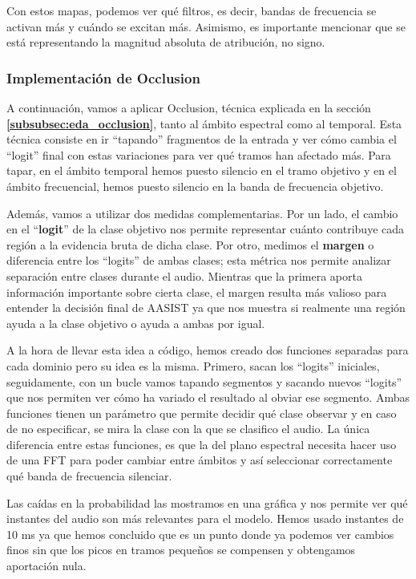 Con estos mapas, podemos ver qué filtros, es decir, bandas de frecuencia se activan más y cuándo se excitan más. Asimismo, es importante mencionar que se está representando la magnitud absoluta de atribución, no signo.

\subsubsection*{Implementación de Occlusion}
A continuación, vamos a aplicar Occlusion, técnica explicada en la sección \textbf{\ref{subsubsec:eda_occlusion}}, tanto al ámbito espectral como al temporal. Esta técnica consiste en ir ``tapando'' fragmentos de la entrada y ver cómo cambia el ``logit'' final con estas variaciones para ver qué tramos han afectado más. Para tapar, en el ámbito temporal hemos puesto silencio en el tramo objetivo y en el ámbito frecuencial, hemos puesto silencio en la banda de frecuencia objetivo.

Además, vamos a utilizar dos medidas complementarias. Por un lado, el cambio en el ``\textbf{logit}'' de la clase objetivo nos permite representar cuánto contribuye cada región a la evidencia bruta de dicha clase. Por otro, medimos el \textbf{margen} o diferencia entre los ``logits'' de ambas clases; esta métrica nos permite analizar separación entre clases durante el audio. Mientras que la primera aporta información importante sobre cierta clase, el margen resulta más valioso para entender la decisión final de AASIST ya que nos muestra si realmente una región ayuda a la clase objetivo o ayuda a ambas por igual. 

A la hora de llevar esta idea a código, hemos creado dos funciones separadas para cada dominio pero su idea es la misma. Primero, sacan los ``logits'' iniciales, seguidamente, con un bucle vamos tapando segmentos y sacando nuevos ``logits'' que nos permiten ver cómo ha variado el resultado al obviar ese segmento. Ambas funciones tienen un parámetro que permite decidir qué clase observar y en caso de no especificar, se mira la clase con la que se clasifico el audio.
La única diferencia entre estas funciones, es que la del plano espectral necesita hacer uso de una FFT para poder cambiar entre ámbitos y así seleccionar correctamente qué banda de frecuencia silenciar.

Las caídas en la probabilidad las mostramos en una gráfica y nos permite ver qué instantes del audio son más relevantes para el modelo. 
Hemos usado instantes de 10 ms ya que hemos concluido que es un punto donde ya podemos ver cambios finos sin que los picos en tramos pequeños se compensen y obtengamos aportación nula.

